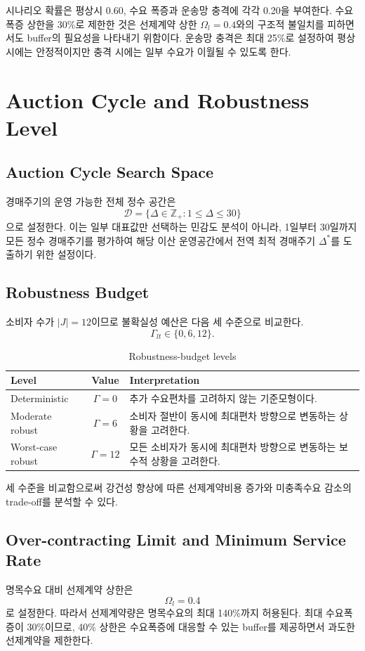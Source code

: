 \documentclass[11pt,a4paper]{article}
\begin{document}
시나리오 확률은 평상시 0.60, 수요 폭증과 운송망 충격에 각각 0.20을 부여한다. 수요폭증 상한을 30\%로 제한한 것은 선제계약 상한 $\Omega_l=0.4$와의 구조적 불일치를 피하면서도 buffer의 필요성을 나타내기 위함이다. 운송망 충격은 최대 25\%로 설정하여 평상시에는 안정적이지만 충격 시에는 일부 수요가 이월될 수 있도록 한다.

\section{Auction Cycle and Robustness Level}

\subsection{Auction Cycle Search Space}
경매주기의 운영 가능한 전체 정수 공간은
\[
\mathcal{D}
=\{\Delta\in\mathbb{Z}_{+}:1\leq\Delta\leq30\}
\]
으로 설정한다. 이는 일부 대표값만 선택하는 민감도 분석이 아니라, 1일부터 30일까지 모든 정수 경매주기를 평가하여 해당 이산 운영공간에서 전역 최적 경매주기 $\Delta^{*}$를 도출하기 위한 설정이다.

\subsection{Robustness Budget}
소비자 수가 $|J|=12$이므로 불확실성 예산은 다음 세 수준으로 비교한다.
\[
\Gamma_{lt}\in\{0,6,12\}.
\]

\begin{table}[h!]
\centering
\begin{tabularx}{0.88\textwidth}{lcY}
\toprule
\textbf{Level} & \textbf{Value} & \textbf{Interpretation} \\
\midrule
Deterministic & $\Gamma=0$ & 추가 수요편차를 고려하지 않는 기준모형이다. \\
Moderate robust & $\Gamma=6$ & 소비자 절반이 동시에 최대편차 방향으로 변동하는 상황을 고려한다. \\
Worst-case robust & $\Gamma=12$ & 모든 소비자가 동시에 최대편차 방향으로 변동하는 보수적 상황을 고려한다. \\
\bottomrule
\end{tabularx}
\caption{Robustness-budget levels}
\end{table}

세 수준을 비교함으로써 강건성 향상에 따른 선제계약비용 증가와 미충족수요 감소의 trade-off를 분석할 수 있다.

\subsection{Over-contracting Limit and Minimum Service Rate}
명목수요 대비 선제계약 상한은
\[
\Omega_l=0.4
\]
로 설정한다. 따라서 선제계약량은 명목수요의 최대 140\%까지 허용된다. 최대 수요폭증이 30\%이므로, 40\% 상한은 수요폭증에 대응할 수 있는 buffer를 제공하면서 과도한 선제계약을 제한한다.
\end{document}
